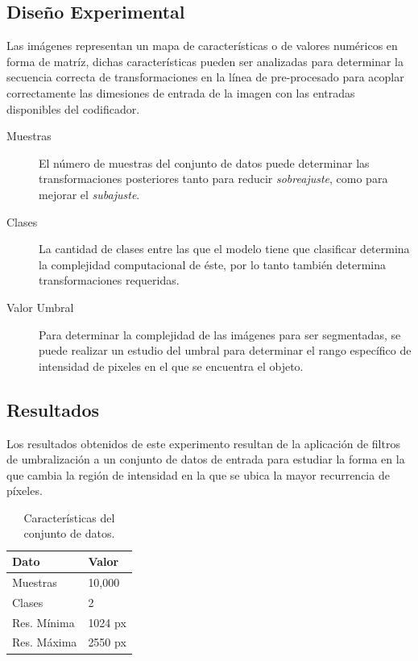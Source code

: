\subsection{Diseño Experimental}
Las imágenes representan un mapa de características o de valores numéricos en forma de matríz, dichas características pueden ser analizadas para determinar la secuencia correcta de transformaciones en la línea de pre-procesado para acoplar correctamente las dimesiones de entrada de la imagen con las entradas disponibles del codificador.
\begin{description}
    \item[Muestras] El número de muestras del conjunto de datos puede determinar las transformaciones posteriores tanto para reducir \emph{sobreajuste}, como para mejorar el \emph{subajuste}.
    \item[Clases] La cantidad de clases entre las que el modelo tiene que clasificar determina la complejidad computacional de éste, por lo tanto también determina transformaciones requeridas.
    \item[Valor Umbral] Para determinar la complejidad de las imágenes para ser segmentadas, se puede realizar un estudio del umbral para determinar el rango específico de intensidad de pixeles en el que se encuentra el objeto.
\end{description}

\subsection{Resultados}
Los resultados obtenidos de este experimento resultan de la aplicación de filtros de umbralización a un conjunto de datos de entrada para estudiar la forma en la que cambia la región de intensidad en la que se ubica la mayor recurrencia de píxeles.

\begin{table}[b]
    \centering
    \caption{Características del conjunto de datos.}
    \begin{tabular}{|l|l|}
        \hline
        \bf{Dato} & \bf{Valor} \\
        \hline
        Muestras & 10,000 \\
        \hline
        Clases & 2 \\
        \hline
        Res. Mínima & 1024 px \\
        \hline
        Res. Máxima & 2550 px \\
        \hline
    \end{tabular}
\end{table}

